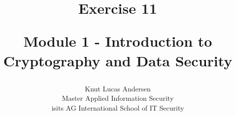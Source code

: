 \title{ 
	\begin{center} \textbf{ Exercise 11 } \end{center}
	\begin{center} {\large Module 1 - Introduction to Cryptography and Data Security } \end{center}
}

\author{ 
	Knut Lucas Andersen \\
	Master Applied Information Security \\
	isits AG International School of IT Security
}